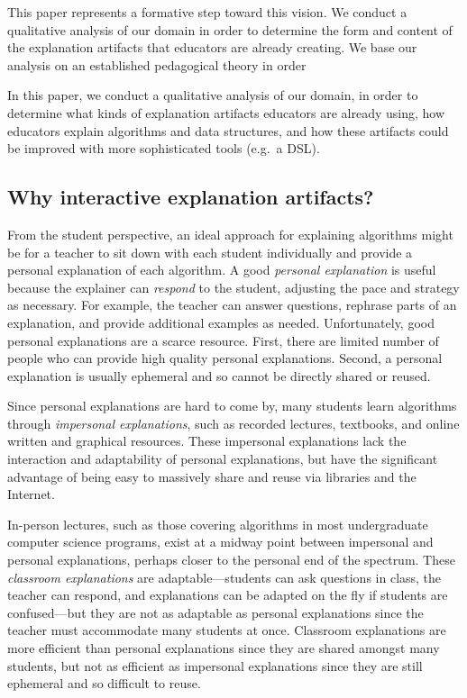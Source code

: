 \documentclass[conference]{IEEEtran}
\begin{document}
This paper represents a formative step toward this vision. We conduct a
qualitative analysis of our domain in order to determine the form and content
of the explanation artifacts that educators are already creating. We base our
analysis on an established pedagogical theory in order 

In this paper, we conduct a qualitative analysis of our domain, in order to
determine what kinds of explanation artifacts educators are already using, how
educators explain algorithms and data structures, and how these artifacts could
be improved with more sophisticated tools (e.g.\ a DSL).



\subsection{Why interactive explanation artifacts?}
\label{sec:artifacts}

From the student perspective, an ideal approach for explaining algorithms might
be for a teacher to sit down with each student individually and provide a
personal explanation of each algorithm. A good \emph{personal explanation} is
useful because the explainer can \emph{respond} to the student, adjusting the
pace and strategy as necessary. For example, the teacher can answer questions,
rephrase parts of an explanation, and provide additional examples as needed.
%
Unfortunately, good personal explanations are a scarce resource. First, there
are limited number of people who can provide high quality personal
explanations. Second, a personal explanation is usually ephemeral and so cannot
be directly shared or reused.


Since personal explanations are hard to come by, many students learn algorithms
through \emph{impersonal explanations}, such as recorded lectures, textbooks,
and online written and graphical resources.
%
These impersonal explanations lack the interaction and adaptability of personal
explanations, but have the significant advantage of being easy to massively
share and reuse via libraries and the Internet.


In-person lectures, such as those covering algorithms in most undergraduate
computer science programs, exist at a midway point between impersonal and
personal explanations, perhaps closer to the personal end of the spectrum.
These \emph{classroom explanations} are adaptable---students can ask questions
in class, the teacher can respond, and explanations can be adapted on the fly
if students are confused---but they are not as adaptable as personal
explanations since the teacher must accommodate many students at once.
Classroom explanations are more efficient than personal explanations since they
are shared amongst many students, but not as efficient as impersonal
explanations since they are still ephemeral and so difficult to reuse.
\end{document}

